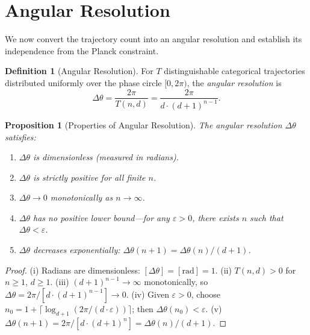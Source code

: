 \documentclass[twocolumn,10pt,a4paper]{article}
\newtheorem{proposition}[theorem]{Proposition}
\theoremstyle{definition}
\newtheorem{definition}[theorem]{Definition}
\theoremstyle{remark}
\begin{document}
\section{Angular Resolution}
\label{sec:angular}

We now convert the trajectory count into an angular resolution and establish its independence from the Planck constraint.

\begin{definition}[Angular Resolution]
\label{def:angular_res}
For $T$ distinguishable categorical trajectories distributed uniformly over the phase circle $[0, 2\pi)$, the \emph{angular resolution} is
\begin{equation}
\label{eq:angular}
\Delta\theta = \frac{2\pi}{T(n,d)} = \frac{2\pi}{d \cdot (d+1)^{n-1}}.
\end{equation}
\end{definition}

\begin{proposition}[Properties of Angular Resolution]
\label{prop:angular_props}
The angular resolution $\Delta\theta$ satisfies:
\begin{enumerate}[label=(\roman*)]
\item $\Delta\theta$ is dimensionless (measured in radians).
\item $\Delta\theta$ is strictly positive for all finite $n$.
\item $\Delta\theta \to 0$ monotonically as $n \to \infty$.
\item $\Delta\theta$ has no positive lower bound---for any $\varepsilon > 0$, there exists $n$ such that $\Delta\theta < \varepsilon$.
\item $\Delta\theta$ decreases exponentially: $\Delta\theta(n+1) = \Delta\theta(n) / (d+1)$.
\end{enumerate}
\end{proposition}

\begin{proof}
(i) Radians are dimensionless: $[\Delta\theta] = [\text{rad}] = 1$. (ii) $T(n,d) > 0$ for $n \geq 1$, $d \geq 1$. (iii) $(d+1)^{n-1} \to \infty$ monotonically, so $\Delta\theta = 2\pi / [d \cdot (d+1)^{n-1}] \to 0$. (iv) Given $\varepsilon > 0$, choose $n_0 = 1 + \lceil \log_{d+1}(2\pi / (d \cdot \varepsilon)) \rceil$; then $\Delta\theta(n_0) < \varepsilon$. (v) $\Delta\theta(n+1) = 2\pi / [d \cdot (d+1)^n] = \Delta\theta(n) / (d+1)$.
\end{proof}
\end{document}
